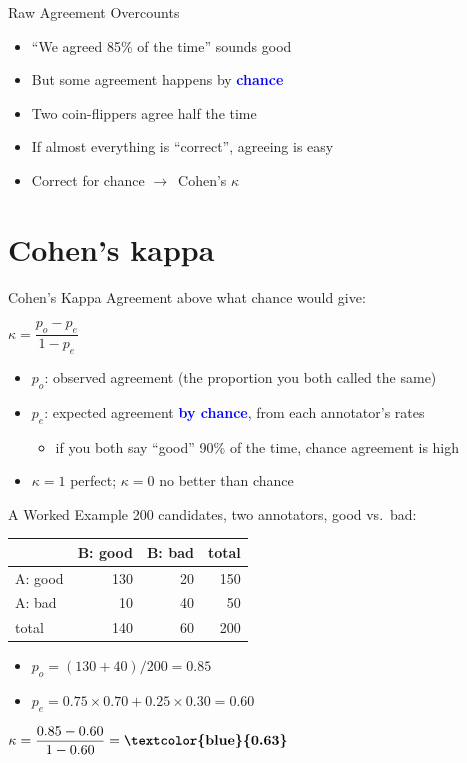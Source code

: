 \documentclass[xetex,aspectratio=169]{beamer}
\newcommand{\txx}[1]{\textbf{\textcolor{blue}{#1}}}
\newcommand{\into}{\ensuremath{\rightarrow}\xspace}
\begin{document}
\begin{frame}{Raw Agreement Overcounts}
  \begin{itemize}
  \item ``We agreed 85\% of the time'' sounds good
  \item But some agreement happens by \txx{chance}
  \item Two coin-flippers agree half the time
  \item If almost everything is ``correct'', agreeing is easy
  \item Correct for chance \into\ Cohen's $\kappa$
  \end{itemize}
\end{frame}

\section{Cohen's kappa}

\begin{frame}{Cohen's Kappa}
  Agreement above what chance would give:
  \begin{block}{}
    \centering\large
    $\kappa = \dfrac{p_o - p_e}{1 - p_e}$
  \end{block}
  \begin{itemize}
  \item $p_o$: observed agreement (the proportion you both called the same)
  \item $p_e$: expected agreement \txx{by chance}, from each annotator's rates
    \begin{itemize}
    \item if you both say ``good'' 90\% of the time, chance agreement is high
    \end{itemize}
  \item $\kappa = 1$ perfect; $\kappa = 0$ no better than chance
  \end{itemize}
\end{frame}

\begin{frame}{A Worked Example}
  200 candidates, two annotators, good vs.\ bad:
  \begin{center}
  \begin{tabular}{lrrr}
    \toprule
    & B: good & B: bad & total \\
    \midrule
    A: good & 130 & 20 & 150 \\
    A: bad  &  10 & 40 &  50 \\
    \midrule
    total   & 140 & 60 & 200 \\
    \bottomrule
  \end{tabular}
  \end{center}
  \begin{itemize}
  \item $p_o = (130+40)/200 = 0.85$
  \item $p_e = 0.75\!\times\!0.70 + 0.25\!\times\!0.30 = 0.60$
  \end{itemize}
  \begin{block}{}
    \centering $\kappa = \dfrac{0.85 - 0.60}{1 - 0.60} = \txx{0.63}$
  \end{block}
\end{frame}
\end{document}
